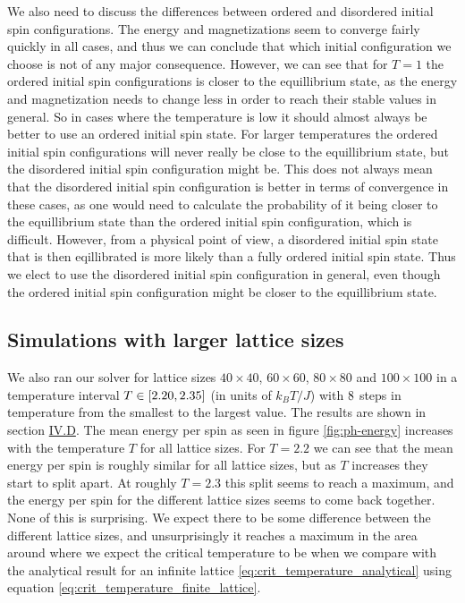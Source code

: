 \documentclass[reprint,english,notitlepage]{revtex4-1}  %
\begin{document}
We also need to discuss the differences between ordered and disordered initial spin configurations. The energy and magnetizations seem to converge fairly quickly in all cases, and thus we can conclude that which initial configuration we choose is not of any major consequence. However, we can see that for $T=1$ the ordered initial spin configurations is closer to the equillibrium state, as the energy and magnetization needs to change less in order to reach their stable values in general. So in cases where the temperature is low it should almost always be better to use an ordered initial spin state. For larger temperatures the ordered initial spin configurations will never really be close to the equillibrium state, but the disordered initial spin configuration might be. This does not always mean that the disordered initial spin configuration is better in terms of convergence in these cases, as one would need to calculate the probability of it being closer to the equillibrium state than the ordered initial spin configuration, which is difficult. However, from a physical point of view, a disordered initial spin state that is then eqillibrated is more likely than a fully ordered initial spin state. Thus we elect to use the disordered initial spin configuration in general, even though the ordered initial spin configuration might be closer to the equillibrium state.



\subsection{Simulations with larger lattice sizes} \label{sec:V:D}

We also ran our solver for lattice sizes $40\times 40$, $60\times 60$, $80 \times 80$ and $100 \times 100$ in a temperature interval $T\in [2.20,2.35]$ (in units of $k_B T/J$) with $8$ steps in temperature from the smallest to the largest value. The results are shown in section \hyperref[sec:IV.D]{IV.D}. The mean energy per spin as seen in figure \ref{fig:ph-energy} increases with the temperature $T$ for all lattice sizes. For $T=2.2$ we can see that the mean energy per spin is roughly similar for all lattice sizes, but as $T$ increases they start to split apart. At roughly $T=2.3$ this split seems to reach a maximum, and the energy per spin for the different lattice sizes seems to come back together. None of this is surprising. We expect there to be some difference between the different lattice sizes, and unsurprisingly it reaches a maximum in the area around where we expect the critical temperature to be when we compare with the analytical result for an infinite lattice \eqref{eq:crit_temperature_analytical} using equation \eqref{eq:crit_temperature_finite_lattice}.
\end{document}
